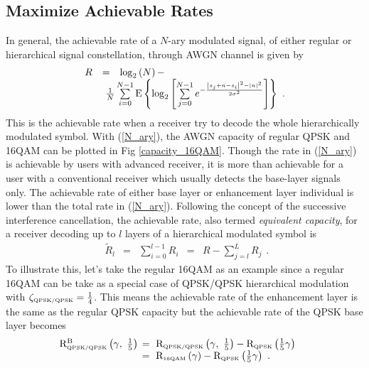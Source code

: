 \documentclass[conference]{IEEEtran}
\begin{document}
\subsection{Maximize Achievable Rates~\label{Info_Theory}}
In general, the achievable rate of a $N$-ary modulated signal, of
either regular or hierarchical signal constellation, through AWGN
channel is given by~\cite{Unge82}
\begin{equation}
\begin{array}{lcl}
R&=&\log_{2}\left(N\right)-\\
&&\hspace{-0.20in}\frac{1}{N}\sum\limits_{i=0}^{N-1}\mbox{E}\left\{\log_{2}\left[\sum\limits_{j=0}^{N-1}e^{-\frac{\left|s_{j}+n-s_{i}\right|^2-\left|n\right|^2}{2\sigma^2}}\right]\right\}\
.
\end{array}\label{N_ary}
\end{equation}
\noindent This is the achievable rate when a receiver try to
decode the whole hierarchically modulated symbol. With
(\ref{N_ary}), the AWGN capacity of regular QPSK and 16QAM can be
plotted in Fig \ref{capacity_16QAM}. Though the rate in
(\ref{N_ary}) is achievable by users with advanced receiver, it is
more than achievable for a user with a conventional receiver which
usually detects the base-layer signals only. The achievable rate
of either base layer or enhancement layer individual is lower than
the total rate in (\ref{N_ary}). Following the concept of the
successive interference cancellation, the achievable rate, also
termed {\em equivalent capacity}, for a receiver decoding up to
$l$ layers of a hierarchical modulated symbol is~\cite{Huber94}
\begin{equation}
\begin{array}{rcccl}
\tilde{R}_{l}&=&\sum\limits_{i=0}^{l-1}R_{i}& = &
R-\sum\limits_{j=l}^{L}{R}_{j}
\end{array}.\label{R_equiv}
\end{equation}
\noindent To illustrate this, let's take the regular 16QAM as an
example since a regular 16QAM can be take as a special case of
QPSK/QPSK hierarchical modulation with $\zeta_{\mbox{\tiny
QPSK/QPSK}}=\frac{1}{4}$. This means the achievable rate of the
enhancement layer is the same as the regular QPSK capacity but the
achievable rate of the QPSK base layer becomes
\begin{equation}\hspace{-0.2in}
\begin{array}{rl}
{\rm R}_{\mbox{\tiny QPSK/QPSK}}^{\rm B}\left(\gamma,\
\frac{1}{5}\right)&\hspace{-0.08in}=\ {\rm R}_{\mbox{\tiny
QPSK/QPSK}}\left(\gamma,\
\frac{1}{5}\right)-{\rm R}_{\mbox{\tiny QPSK}} \left(\frac{1}{5}\gamma\right)\\
&\hspace{-0.08in}=\ {\rm R}_{\mbox{\tiny
16QAM}}\left(\gamma\right)-{\rm R}_{\mbox{\tiny
QPSK}}\left(\frac{1}{5}\gamma\right)\ .
\end{array}\label{R_16QAM_B1}
\end{equation}
\end{document}
